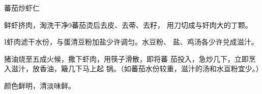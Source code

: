 \begin{recipe}{蕃茄炒虾仁}

\ingredients


\cooking

\step 鲜虾挤肉，淘洗干净9蕃茄烫后去皮、去蒂、去籽， 用刀切成与奸肉大的丁颗。

I虾肉滤干水份，与蛋清豆粉加盐少许调匀。水豆粉、 盐、鸡汤各少许兑成滋汁。

\step 猪油烧至五成火候，撒下虾肉，用筷子滑散，即将蕃 茄投入，急炒几下，立即烹入滋汁，放香油，簸几下马上起 锅。（如蕃茄水份较重，滋汁的汤和水亘粉宜少。）

\notes

颜色鲜明，清淡味鲜。

\end{recipe}

